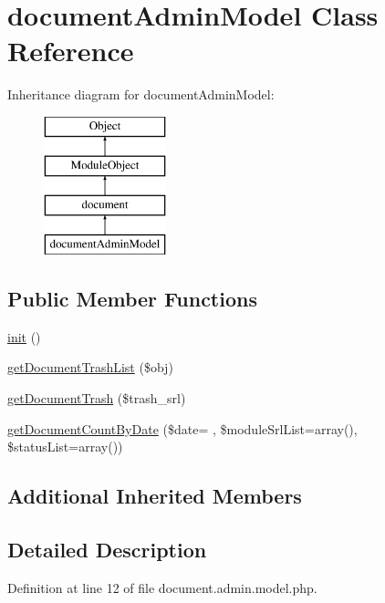 \hypertarget{classdocumentAdminModel}{}\section{document\+Admin\+Model Class Reference}
\label{classdocumentAdminModel}
Inheritance diagram for document\+Admin\+Model\+:\begin{figure}[H]
\begin{center}
\leavevmode
\includegraphics[height=4.000000cm]{classdocumentAdminModel}
\end{center}
\end{figure}
\subsection*{Public Member Functions}
\begin{DoxyCompactItemize}
\item 
\hyperlink{classdocumentAdminModel_aa2d2c19a8a236499b03c085bbf578c11}{init} ()
\item 
\hyperlink{classdocumentAdminModel_a2dde1d3304ebc18a52a841aee71b4fad}{get\+Document\+Trash\+List} (\$obj)
\item 
\hyperlink{classdocumentAdminModel_a4cff1ba3f56281a915059ecdbcdfd740}{get\+Document\+Trash} (\$trash\+\_\+srl)
\item 
\hyperlink{classdocumentAdminModel_af678afbc6a4c06e1913f30755a370ab0}{get\+Document\+Count\+By\+Date} (\$date= \textquotesingle{}\textquotesingle{}, \$module\+Srl\+List=array(), \$status\+List=array())
\end{DoxyCompactItemize}
\subsection*{Additional Inherited Members}


\subsection{Detailed Description}


Definition at line 12 of file document.\+admin.\+model.\+php.



